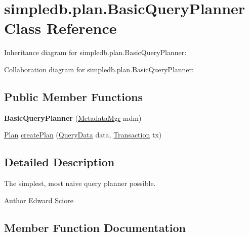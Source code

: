 \hypertarget{classsimpledb_1_1plan_1_1BasicQueryPlanner}{}\section{simpledb.\+plan.\+Basic\+Query\+Planner Class Reference}
\label{classsimpledb_1_1plan_1_1BasicQueryPlanner}


Inheritance diagram for simpledb.\+plan.\+Basic\+Query\+Planner\+:


Collaboration diagram for simpledb.\+plan.\+Basic\+Query\+Planner\+:
\subsection*{Public Member Functions}
\begin{DoxyCompactItemize}
\item 
\mbox{\label{classsimpledb_1_1plan_1_1BasicQueryPlanner_aeffd8b1366a10ff9cc0e7cb0441a4514}} 
{\bfseries Basic\+Query\+Planner} (\hyperlink{classsimpledb_1_1metadata_1_1MetadataMgr}{Metadata\+Mgr} mdm)
\item 
\hyperlink{interfacesimpledb_1_1plan_1_1Plan}{Plan} \hyperlink{classsimpledb_1_1plan_1_1BasicQueryPlanner_af3daad5c5e44335beb608d1f4f5bf16f}{create\+Plan} (\hyperlink{classsimpledb_1_1parse_1_1QueryData}{Query\+Data} data, \hyperlink{classsimpledb_1_1tx_1_1Transaction}{Transaction} tx)
\end{DoxyCompactItemize}


\subsection{Detailed Description}
The simplest, most naive query planner possible. \begin{DoxyAuthor}{Author}
Edward Sciore 
\end{DoxyAuthor}


\subsection{Member Function Documentation}
\mbox{\label{classsimpledb_1_1plan_1_1BasicQueryPlanner_af3daad5c5e44335beb608d1f4f5bf16f}} 
